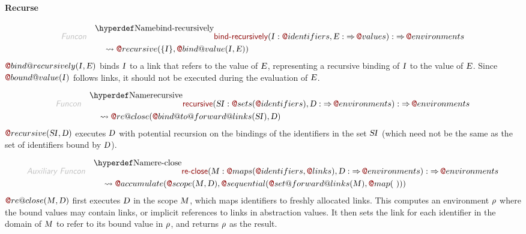 \paragraph{Recurse}\hypertarget{recurse}{}\label{recurse}

\begin{align*}
  \KEY{Funcon} \quad
  & \FUNDEC{bind-recursively}(
                     \VAR{I} : \FUN@identifiers, \VAR{E} :  \TO \FUN@values) 
    :  \TO \FUN@environments \\&\quad
    \leadsto \FUN@recursive
               (  \{  \VAR{I} \}, 
                      \FUN@bind@value
                       (  \VAR{I}, 
                              \VAR{E} ) )
\end{align*}
$\FUN@bind@recursively
    (  \VAR{I}, 
           \VAR{E} )$ binds $\VAR{I}$ to a link that refers to the value of $\VAR{E}$, 
  representing a recursive binding of $\VAR{I}$ to the value of $\VAR{E}$.
  Since $\FUN@bound@value
    (  \VAR{I} )$ follows links, it should not be executed during the
  evaluation of $\VAR{E}$.

\begin{align*}
  \KEY{Funcon} \quad
  & \FUNDEC{recursive}(
                     \VAR{SI} : \FUN@sets
                               (  \FUN@identifiers ), \VAR{D} :  \TO \FUN@environments) 
    :  \TO \FUN@environments \\&\quad
    \leadsto \FUN@re@close
               (  \FUN@bind@to@forward@links
                       (  \VAR{SI} ), 
                      \VAR{D} )
\end{align*}
$\FUN@recursive
    (  \VAR{SI}, 
           \VAR{D} )$ executes $\VAR{D}$ with potential recursion on the bindings of 
  the identifiers in the set $\VAR{SI}$ (which need not be the same as the set of
  identifiers bound by $\VAR{D}$).

\begin{align*}
  \KEY{Auxiliary Funcon} \quad
  & \FUNDEC{re-close}(
                     \VAR{M} : \FUN@maps
                               (  \FUN@identifiers, 
                                      \FUN@links ), \VAR{D} :  \TO \FUN@environments) 
    :  \TO \FUN@environments \\&\quad
    \leadsto \FUN@accumulate
               (  \FUN@scope
                       (  \VAR{M}, 
                              \VAR{D} ), 
                      \FUN@sequential
                       (  \FUN@set@forward@links
                               (  \VAR{M} ), 
                              \FUN@map
                               (   \  ) ) )
\end{align*}
$\FUN@re@close
    (  \VAR{M}, 
           \VAR{D} )$ first executes $\VAR{D}$ in the scope $\VAR{M}$, which maps identifiers
  to freshly allocated links. This computes an environment $\VAR{\ensuremath{\rho}}$ where the bound
  values may contain links, or implicit references to links in abstraction
  values. It then sets the link for each identifier in the domain of $\VAR{M}$ to
  refer to its bound value in $\VAR{\ensuremath{\rho}}$, and returns $\VAR{\ensuremath{\rho}}$ as the result.

